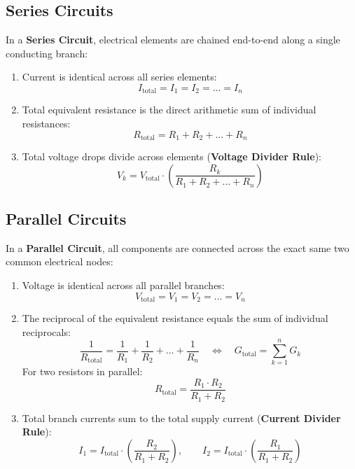 \subsection{Series Circuits}
In a \textbf{Series Circuit}, electrical elements are chained end-to-end along a single conducting branch:
\begin{enumerate}[label=\bfseries\arabic*.]
    \item Current is identical across all series elements:
    \begin{equation}
    \label{eq:series_current}
    I_{\text{total}} = I_1 = I_2 = \dots = I_n
    \end{equation}
    \item Total equivalent resistance is the direct arithmetic sum of individual resistances:
    \begin{equation}
    \label{eq:series_res}
    \boxed{R_{\text{total}} = R_1 + R_2 + \dots + R_n}
    \end{equation}
    \item Total voltage drops divide across elements (\textbf{Voltage Divider Rule}):
    \begin{equation}
    \label{eq:voltage_divider}
    \boxed{V_k = V_{\text{total}} \cdot \left( \frac{R_k}{R_1 + R_2 + \dots + R_n} \right)}
    \end{equation}
\end{enumerate}

\subsection{Parallel Circuits}
In a \textbf{Parallel Circuit}, all components are connected across the exact same two common electrical nodes:
\begin{enumerate}[label=\bfseries\arabic*.]
    \item Voltage is identical across all parallel branches:
    \begin{equation}
    \label{eq:parallel_voltage}
    V_{\text{total}} = V_1 = V_2 = \dots = V_n
    \end{equation}
    \item The reciprocal of the equivalent resistance equals the sum of individual reciprocals:
    \begin{equation}
    \label{eq:parallel_res}
    \boxed{\frac{1}{R_{\text{total}}} = \frac{1}{R_1} + \frac{1}{R_2} + \dots + \frac{1}{R_n} \quad \Longleftrightarrow \quad G_{\text{total}} = \sum_{k=1}^{n} G_k}
    \end{equation}
    For two resistors in parallel:
    \begin{equation}
    \label{eq:two_res_parallel}
    \boxed{R_{\text{total}} = \frac{R_1 \cdot R_2}{R_1 + R_2}}
    \end{equation}
    \item Total branch currents sum to the total supply current (\textbf{Current Divider Rule}):
    \begin{equation}
    \label{eq:current_divider}
    \boxed{I_1 = I_{\text{total}} \cdot \left( \frac{R_2}{R_1 + R_2} \right), \qquad I_2 = I_{\text{total}} \cdot \left( \frac{R_1}{R_1 + R_2} \right)}
    \end{equation}
\end{enumerate}

